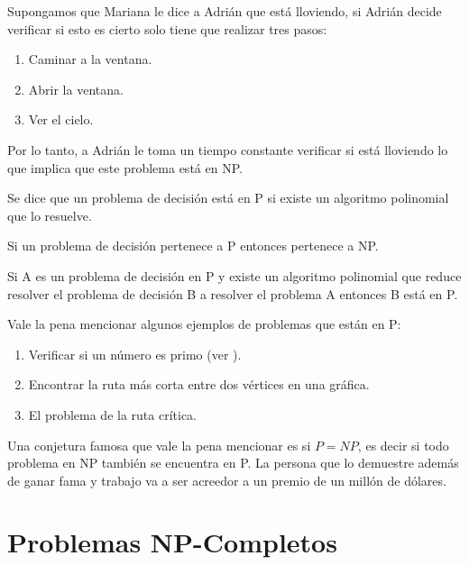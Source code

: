 \begin{eje}
Supongamos que Mariana le dice a Adrián que está lloviendo, si Adrián decide verificar si esto es cierto solo tiene que realizar tres pasos:
\begin{enumerate}
\item Caminar a la ventana.
\item Abrir la ventana.
\item Ver el cielo.
\end{enumerate}
Por lo tanto, a Adrián le toma un tiempo constante verificar si está lloviendo lo que implica que este problema está en NP.
 \fin
\end{eje}
\begin{dfn}
Se dice que un problema de decisión está en P si existe un algoritmo polinomial que lo resuelve.
\end{dfn}
\begin{obs}[$P \subseteq NP$]
Si un problema de decisión pertenece a P entonces pertenece a NP.
\end{obs}
\begin{obs}
\label{pp eq}
Si A es un problema de decisión en P y existe un algoritmo polinomial que reduce resolver el problema de decisión B a resolver el problema A entonces B está en P.
\end{obs}

Vale la pena mencionar algunos ejemplos de problemas que están en P:
\begin{enumerate}
\item Verificar si un número es primo (ver \cite{agrawal2004primes}).
\item Encontrar la ruta más corta entre dos vértices en una gráfica.
\item El problema de la ruta crítica. 
\end{enumerate}

Una conjetura famosa que vale la pena mencionar es si $P=NP$, es decir si todo problema en NP también se encuentra en P. La persona que lo demuestre además de ganar fama y trabajo va a ser acreedor a un premio de un millón de dólares. 


\section{Problemas NP-Completos}

